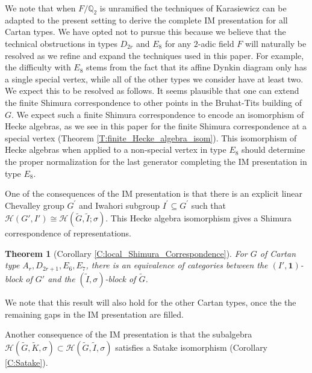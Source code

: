\documentclass[10pt, letterpaper]{amsart}
\theoremstyle{plain}
\newtheorem{Thm}[equation]{Theorem}
\theoremstyle{definition}
\numberwithin{equation}{section}
\newcommand{\Gt}{\widetilde{G}}
\newcommand{\It}{\widetilde{I}}
\newcommand{\Kt}{\widetilde{K}}
\newcommand{\Hcal}{\mathcal{H}}
\newcommand{\one}{\mathbf{1}}
\begin{document}
We note that when $F/\mathbb{Q}_{2}$ is unramified the techniques of Karasiewicz \cite{Karasiewicz} can be adapted to the present setting to derive the complete IM presentation for all Cartan types. We have opted not to pursue this because we believe that the technical obstructions in types $D_{2r}$ and $E_{8}$ for any $2$-adic field $F$ will naturally be resolved as we refine and expand the techniques used in this paper. For example, the difficulty with $E_{8}$ stems from the fact that its affine Dynkin diagram only has a single special vertex, while all of the other types we consider have at least two. We expect this to be resolved as follows. It seems plausible that one can extend the finite Shimura correspondence to other points in the Bruhat-Tits building of $G$. We expect such a finite Shimura correspondence to encode an isomorphism of Hecke algebras, as we see in this paper for the finite Shimura correspondence at a special vertex (Theorem \ref{T:finite_Hecke_algebra_isom}). This isomorphism of Hecke algebras when applied to a non-special vertex in type $E_{8}$ should determine the proper normalization for the last generator completing the IM presentation in type $E_{8}$.

One of the consequences of the IM presentation is that there is an explicit linear Chevalley group $G^{\prime}$ and Iwahori subgroup $I^{\prime}\subseteq G^{\prime}$ such that $\Hcal(G', I')\cong\Hcal(\Gt, \It; \sigma)$. This Hecke algebra isomorphism gives a Shimura correspondence of representations.

\begin{Thm}[Corollary \ref{C:local_Shimura_Correspondence}]
    For $G$ of Cartan type $A_{r},D_{2r+1},E_{6},E_{7}$, there is an equivalence of categories between the $(I',\one)$-block of $G'$ and the $(\It, \sigma)$-block of $\Gt$.
\end{Thm}
We note that this result will also hold for the other Cartan types, once the the remaining gaps in the IM presentation are filled. 

Another consequence of the IM presentation is that the subalgebra $\Hcal(\Gt,\Kt,\sigma)\subset \Hcal(\Gt,\It,\sigma)$ satisfies a Satake isomorphism (Corollary \ref{C:Satake}). 

\end{document}
